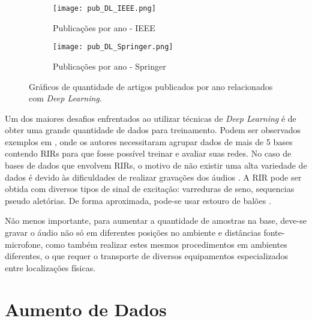 \begin{figure} [H]
    \begin{subfigure}{1\textwidth}
        \centering
        \texttt{[image: pub\_DL\_IEEE.png]}
        \caption{Publicações por ano - IEEE}    
    \end{subfigure}
    \begin{subfigure}{1\textwidth}
        \centering
        \texttt{[image: pub\_DL\_Springer.png]}
        \caption{Publicações por ano - Springer\textregistered}    
    \end{subfigure}
    \caption{Gráficos de quantidade de artigos publicados por ano relacionados com \textit{Deep Learning}.}
    \label{fig:pub_DL}
\end{figure}


Um dos maiores desafios enfrentados ao utilizar técnicas de \textit{Deep Learning} é de obter uma grande quantidade de dados para treinamento.
Podem ser observados exemplos em \cite{Estimation_RT_DRR,ACE_Data_Aug_Eval}, onde os autores necessitaram agrupar dados de mais de 5 bases contendo
RIRs para que fosse possível treinar e avaliar suas redes.
No caso de bases de dados que envolvem RIRs, o motivo de não existir uma alta variedade de dados é devido às dificuldades
de realizar gravações dos áudios \cite{Recording_RIR_2}.
A RIR pode ser obtida com diversos tipos de sinal de excitação: varreduras de seno, sequencias pseudo aletórias. 
De forma aproximada, pode-se usar estouro de balões \cite{Recording_RIR}.

Não menos importante, para aumentar a quantidade de amostras na base, deve-se gravar o áudio não só em diferentes posições no ambiente
e distâncias fonte-microfone, como também realizar estes mesmos procedimentos em ambientes diferentes, o que requer o transporte de diversos equipamentos
especializados entre localizações físicas.

\section{Aumento de Dados}

